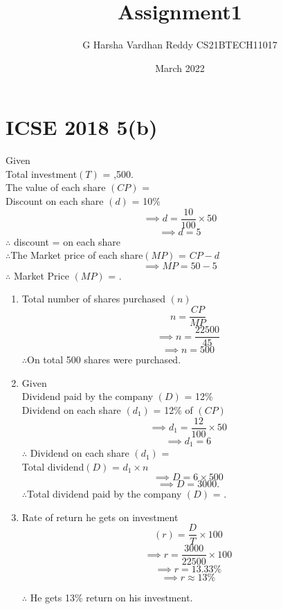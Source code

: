 \documentclass[journal,12pt,twocolumn]{IEEEtran}
\title{Assignment1}
\author{G Harsha Vardhan Reddy CS21BTECH11017}
\date{March 2022}
\begin{document}
\maketitle
\section*{\textbf{ICSE 2018 5(b)}}
\begin{table}[h]
\end{table}
Given\\
Total investment\((T)\) = ,500.\\
The value of each share \( (CP) \) = \\
Discount on each share \( (d)\) = 10\%  \[\implies d =\frac{10}{100}\times50\]
 \[\implies d = 5\]
$ \therefore$ discount =  on each share\\
$\therefore$The Market price of each share\((MP)\) = \( CP - d \)\[\implies MP = 50 - 5 \]
$\therefore$ Market Price \((MP)\) =  . 
\begin{enumerate}
    \item 
    Total number of shares purchased \((n)\) \[ n =\frac{CP}{MP}\]
    \[\implies n = \frac{22500}{45}\]
         \[\implies n = 500\]
    $\therefore$On total 500 shares were purchased.
    \item
    Given\\
    Dividend paid by the company \((D)\) = 12\%\\
    Dividend on each share \((d_1)\) = 12\% of \((CP)\)  
    \[\implies d_1 = \frac{12}{100}\times 50 \]
    \[\implies d_1 = 6\]
    $\therefore$ Dividend on each share \((d_1)\) = \\
   Total dividend\((D)\) = $ d_1 \times n $
  \[\implies D = 6 \times 500\]
  \[\implies D = 3000.\]
    $\therefore$Total dividend paid by the company \((D)\) = .
    \item
    Rate of return he gets on investment
    \[ (r) = \frac{D}{T} \times 100\]
    \[\implies r = \frac{3000}{22500}\times 100\]
    \[\implies r = 13.33\% \]
    \[\implies r \approx 13\%\]
    
    $\therefore$ He gets 13\% return on his investment.
\end{enumerate}

\end{document}
